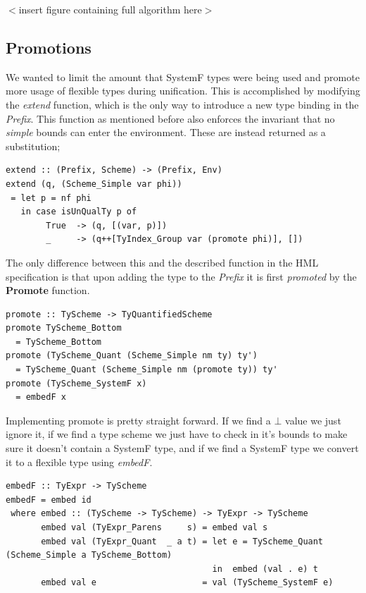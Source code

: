 \documentclass[12pt, a4paper, oneside]{article}
\begin{document}
$<$insert figure containing full algorithm here$>$

\subsection{Promotions}
We wanted to limit the amount that SystemF types were being used and promote more usage of flexible types during unification.
This is accomplished by modifying the \textit{extend} function, which is the only way to introduce a new type binding in the \textit{Prefix}. This function as mentioned before also enforces the invariant that no \textit{simple} bounds can enter the environment. These are instead returned as a substitution;

\begin{lstlisting}
extend :: (Prefix, Scheme) -> (Prefix, Env)
extend (q, (Scheme_Simple var phi))
 = let p = nf phi
   in case isUnQualTy p of
        True  -> (q, [(var, p)])
        _     -> (q++[TyIndex_Group var (promote phi)], [])
\end{lstlisting}

The only difference between this and the described function in the HML specification is that upon adding the type to the \textit{Prefix} it is first \textit{promoted} by the \textbf{Promote} function.

\begin{lstlisting}
promote :: TyScheme -> TyQuantifiedScheme
promote TyScheme_Bottom 
  = TyScheme_Bottom
promote (TyScheme_Quant (Scheme_Simple nm ty) ty') 
  = TyScheme_Quant (Scheme_Simple nm (promote ty)) ty'
promote (TyScheme_SystemF x)                   
  = embedF x
\end{lstlisting}

Implementing promote is pretty straight forward. If we find a $\bot$ value we just ignore it, if we find a type scheme we just have to check in it's bounds to make sure it doesn't contain a SystemF type, and if we find a SystemF type we convert it to a flexible type using \textit{embedF}.

\begin{lstlisting}
embedF :: TyExpr -> TyScheme
embedF = embed id
 where embed :: (TyScheme -> TyScheme) -> TyExpr -> TyScheme
       embed val (TyExpr_Parens     s) = embed val s
       embed val (TyExpr_Quant  _ a t) = let e = TyScheme_Quant (Scheme_Simple a TyScheme_Bottom)
                                         in  embed (val . e) t
       embed val e                     = val (TyScheme_SystemF e)
\end{lstlisting}
\end{document}
